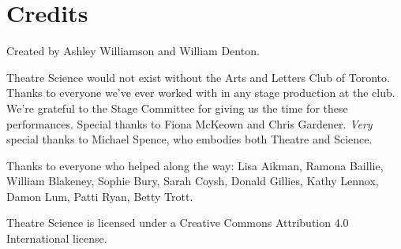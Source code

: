 
\newpage

\section{Credits}

Created by Ashley Williamson and William Denton.

Theatre Science would not exist without the Arts and Letters Club of Toronto.  Thanks to everyone we've ever worked with in any stage production at the club.  We're grateful to the Stage Committee for giving us the time for these performances.  Special thanks to Fiona McKeown and Chris Gardener.  \textit{Very} special thanks to Michael Spence, who embodies both Theatre and Science.

Thanks to everyone who helped along the way:  Lisa Aikman, Ramona Baillie, William Blakeney, Sophie Bury, Sarah Coysh, Donald Gillies, Kathy Lennox, Damon Lum, Patti Ryan, Betty Trott.

Theatre Science is licensed under a Creative Commons Attribution 4.0 International license.  \ccby
